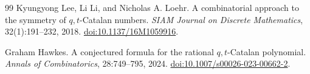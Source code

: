 \documentclass[11pt]{article}
\theoremstyle{plain}
\theoremstyle{definition}
\theoremstyle{remark}
\begin{document}
\begin{thebibliography}{99}
Kyungyong Lee, Li Li, and Nicholas A. Loehr.
\newblock A combinatorial approach to the symmetry of \(q,t\)-Catalan numbers.
\newblock \emph{SIAM Journal on Discrete Mathematics}, 32(1):191--232, 2018.
\newblock \href{https://doi.org/10.1137/16M1059916}{doi:10.1137/16M1059916}.

Graham Hawkes.
\newblock A conjectured formula for the rational \(q,t\)-Catalan polynomial.
\newblock \emph{Annals of Combinatorics}, 28:749--795, 2024.
\newblock \href{https://doi.org/10.1007/s00026-023-00662-2}{doi:10.1007/s00026-023-00662-2}.
\end{thebibliography}
\end{document}
